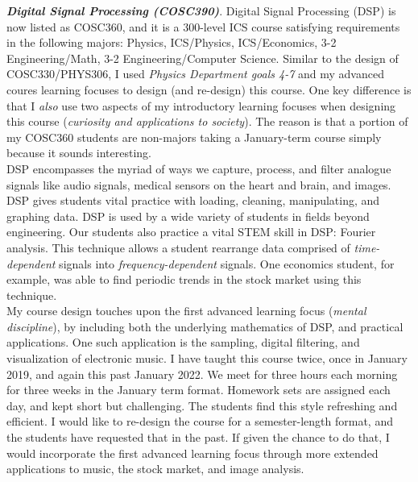 \documentclass[../../../main.tex]{subfiles}
\begin{document}
\textbf{\textit{Digital Signal Processing (COSC390)}}.  Digital Signal Processing (DSP) is now listed as COSC360, and it is a 300-level ICS course satisfying requirements in the following majors: Physics, ICS/Physics, ICS/Economics, 3-2 Engineering/Math, 3-2 Engineering/Computer Science.  Similar to the design of COSC330/PHYS306, I used \textit{Physics Department goals 4-7} and my advanced coures learning focuses to design (and re-design) this course.  One key difference is that I \textit{also} use two aspects of my introductory learning focuses when designing this course (\textit{curiosity and applications to society}).  The reason is that a portion of my COSC360 students are non-majors taking a January-term course simply because it sounds interesting.
\\
\vspace{0.25cm}
DSP encompasses the myriad of ways we capture, process, and filter analogue signals like audio signals, medical sensors on the heart and brain, and images.  DSP gives students vital practice with loading, cleaning, manipulating, and graphing data.  DSP is used by a wide variety of students in fields beyond engineering.  Our students also practice a vital STEM skill in DSP: Fourier analysis.  This technique allows a student rearrange data comprised of \textit{time-dependent} signals into \textit{frequency-dependent} signals.  One economics student, for example, was able to find periodic trends in the stock market using this technique.
\\
\vspace{0.25cm}
My course design touches upon the first advanced learning focus (\textit{mental discipline}), by including both the underlying mathematics of DSP, and practical applications.  One such application is the sampling, digital filtering, and visualization of electronic music.  I have taught this course twice, once in January 2019, and again this past January 2022.  We meet for three hours each morning for three weeks in the January term format.  Homework sets are assigned each day, and kept short but challenging.  The students find this style refreshing and efficient.  I would like to re-design the course for a semester-length format, and the students have requested that in the past.  If given the chance to do that, I would incorporate the first advanced learning focus through more extended applications to music, the stock market, and image analysis.
\\
\vspace{0.25cm}
\end{document}
